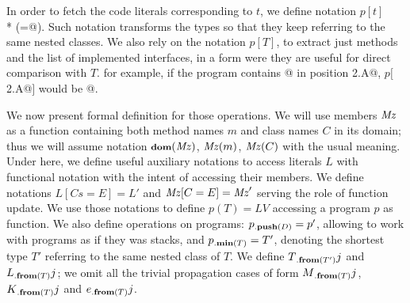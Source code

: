 
In order to fetch the code literals corresponding to $t$,
we define notation $p[t]$\\*
(=@).
Such notation transforms the types so that they keep referring to the same nested classes.
We also rely on the notation $p[T]$, to extract just methods and the list of implemented interfaces, in a form were they are useful for direct comparison with 
$T$.
for example, if the program contains @
in position 
\Q@This2.A@, $p[$\Q@This2.A@$]$ would be 
@.



We now present formal definition for those operations.
We will use members $\mathit{Mz}$ as a function containing both method names $m$
and class names $C$ in its domain; thus we will assume
notation ${\footnotesize{\textbf{dom}}({\mathit{Mz}})}$, $\mathit{Mz}(m)$, $\mathit{Mz}(C)$ with the usual meaning.
Under here, we define useful auxiliary notations to
access literals $L$ with functional notation with the intent of accessing their members. We define notations $L[Cs=E]=L'$ and $\mathit{Mz}[C=E]=\mathit{Mz}'$ serving the role of function update.
We use those notations to define $p(T)=LV$ accessing a program $p$ as function. We also define operations on programs: $p{{}_{.\textbf{push}({D})}}=p'$, allowing to work with programs as if they was stacks, and
$p{{}_{.\textbf{min}({T})}}=T'$, denoting the shortest type $T'$ referring to the same 
nested class of $T$.
We define $T{{}_{.\textbf{from}({T'})}}{j}$ and $L{{}_{.\textbf{from}({T})}}{j}$; we omit all the trivial propagation cases of form $M{{}_{.\textbf{from}({T})}}{j}$, $K{{}_{.\textbf{from}({T})}}{j}$ and $e{{}_{.\textbf{from}({T})}}{j}$.


